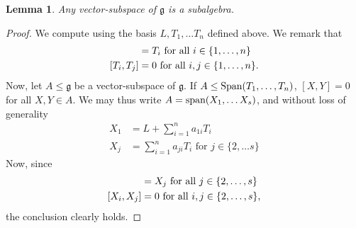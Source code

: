 \documentclass{article}
\newtheorem{lemma}[theorem]{Lemma}
\theoremstyle{definition}
\theoremstyle{remark}
\begin{document}
\begin{lemma}\label{lem: Parallel-subalgebras}
    Any vector-subspace of $\mathfrak{g}$ is a subalgebra.
\end{lemma}
\begin{proof}
    We compute using the basis $L, T_1, \dots T_n$ defined above. We remark that
    \begin{align*}
        [L, T_i] &= T_i \textup{ for all } i\in \{1, \dots, n\}\\
        [T_i, T_j] &= 0 \textup{ for all } i,j \in \{1, \dots, n\}.
    \end{align*}
    Now, let $A\leq \mathfrak{g}$ be a vector-subspace of $\mathfrak{g}$. If $A\leq \textup{Span}(T_1, \dots, T_n)$, $[X,Y] = 0$ for all $X,Y\in A$. We may thus write $A= \textup{span}(X_1, \dots X_{s})$, and without loss of generality
    \begin{align*}
        X_1 &= L + \sum_{i=1}^{n} a_{1i} T_i\\
        X_j &= \sum_{i=1}^{n} a_{ji} T_i \text{ for } j\in \{2, \dots s\}
    \end{align*}
    Now, since
    \begin{align*}
        [X_1, X_j]& = X_j \textup{ for all }j\in \{2, \dots, s \}\\
        [X_i, X_j]&=0\textup{ for all } i,j \in \{2, \dots, s \},
    \end{align*}
    the conclusion clearly holds. 
\end{proof}
\end{document}
